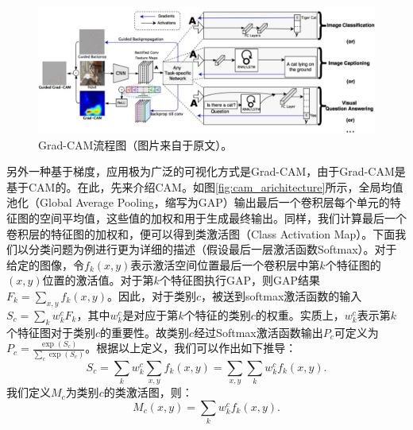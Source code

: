 \begin{figure}[h]
	\centering
	\includegraphics[width=1.0\textwidth]{figure/grad_cam_architecture}
	\caption{Grad-CAM流程图（图片来自于原文）。}
	\label{fig:grad_cam_architecture}
\end{figure}
另外一种基于梯度，应用极为广泛的可视化方式是Grad-CAM，由于Grad-CAM是基于CAM的。在此，先来介绍CAM。如图\ref{fig:cam_arichitecture}所示，全局均值池化（Global Average Pooling，缩写为GAP）输出最后一个卷积层每个单元的特征图的空间平均值，这些值的加权和用于生成最终输出。同样，我们计算最后一个卷积层的特征图的加权和，便可以得到类激活图（Class Activation Map）。下面我们以分类问题为例进行更为详细的描述（假设最后一层激活函数Softmax）。对于给定的图像，令$f_k(x, y)$表示激活空间位置最后一个卷积层中第$k$个特征图的$(x,y)$位置的激活值。对于第$k$个特征图执行GAP，则GAP结果$F_k=\sum_{x, y} f_{k}(x,y)$。因此，对于类别$c$，被送到softmax激活函数的输入$S_c=\sum_{k} w_{k}^{c} F_{k}$，其中$w_k^c$是对应于第$k$个特征的类别$c$的权重。实质上，$w_{k}^{c}$表示第$k$个特征图对于类别$c$的重要性。故类别$c$经过Softmax激活函数输出$P_c$可定义为$
P_c=\frac{\exp \left(S_{c}\right)}{\sum_{c} \exp \left(S_{c}\right)}$。根据以上定义，我们可以作出如下推导： 
\begin{equation*}
S_{c}=\sum_{k} w_{k}^{c} \sum_{x, y} f_{k}(x, y)=\sum_{x, y} \sum_{k} w_{k}^{c} f_{k}(x, y).
\end{equation*}
我们定义$M_c$为类别$c$的类激活图，则：
\begin{equation}\label{equ:cam_heatmap_compute}
M_{c}(x, y)=\sum_{k} w_{k}^{c} f_{k}(x, y).
\end{equation}
